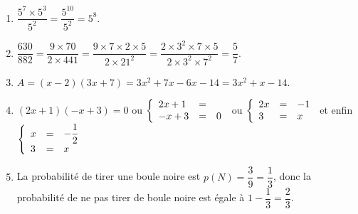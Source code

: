 \begin{enumerate}
\item $\dfrac{5^7 \times 5^3}{5^2} = \dfrac{5^{10}}{5^2} = 5^8$.
\item $\dfrac{630}{882} = \dfrac{9 \times 70}{2 \times 441} = \dfrac{9 \times 7 \times 2 \times 5}{2 \times 21^2}= \dfrac{2 \times 3^2 \times 7 \times 5}{2 \times 3^2 \times 7^2} = \dfrac57$.
\item $A = (x - 2)(3x + 7) = 3x^2 + 7x - 6x - 14 = 3x^2 + x - 14$.
\item $(2x + 1)(- x + 3) = 0$ ou $\left\{\begin{array}{l c l}
2x + 1&=&\\- x + 3&=&0\\
\end{array}\right.$ ou $\left\{\begin{array}{l c l}
2x &=&- 1\\3&=&x\\
\end{array}\right.$ et enfin $\left\{\begin{array}{l c l}
x &=&- \dfrac12\\3&=&x\\
\end{array}\right.$
\item La probabilité de tirer une boule noire est $p(N) = \dfrac39 = \dfrac13$, donc la probabilité de ne pas tirer de boule noire est égale à $1 - \dfrac13 = \dfrac23$.
\end{enumerate}

\bigskip

